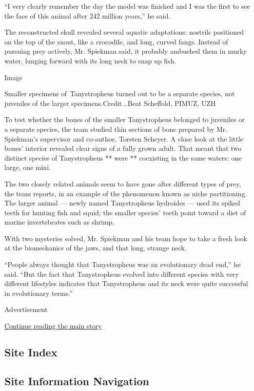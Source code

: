 ``I very clearly remember the day the model was finished and I was the
first to see the face of this animal after 242 million years,'' he said.

The reconstructed skull revealed several aquatic adaptations: nostrils
positioned on the top of the snout, like a crocodile, and long, curved
fangs. Instead of pursuing prey actively, Mr. Spiekman said, it probably
ambushed them in murky water, lunging forward with its long neck to snap
up fish.

Image

Smaller specimens of~Tanystropheus turned out to be a separate species,
not juveniles of the larger specimens.Credit...Beat Scheffold, PIMUZ,
UZH

To test whether the bones of the smaller Tanystropheus belonged to
juveniles or a separate species, the team studied thin sections of bone
prepared by Mr. Spiekman's supervisor and co-author, Torsten Scheyer. A
close look at the little bones' interior revealed clear signs of a fully
grown adult. That meant that two distinct species of Tanystropheus **
were ** coexisting in the same waters: one large, one mini.

The two closely related animals seem to have gone after different types
of prey, the team reports, in an example of the phenomenon known as
niche partitioning. The larger animal --- newly named Tanystropheus
hydroides --- used its spiked teeth for hunting fish and squid; the
smaller species' teeth point toward a diet of marine invertebrates such
as shrimp.

With two mysteries solved, Mr. Spiekman and his team hope to take a
fresh look at the biomechanics of the jaws, and that long, strange neck.

``People always thought that Tanystropheus was an evolutionary dead
end,'' he said. ``But the fact that Tanystropheus evolved into different
species with very different lifestyles indicates that Tanystropheus and
its neck were quite successful in evolutionary terms.''

Advertisement

\protect\hyperlink{after-bottom}{Continue reading the main story}

\hypertarget{site-index}{%
\subsection{Site Index}\label{site-index}}

\hypertarget{site-information-navigation}{%
\subsection{Site Information
Navigation}\label{site-information-navigation}}

